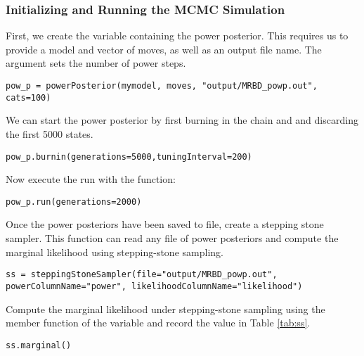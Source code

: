 \subsubsection{Initializing and Running the MCMC Simulation}



First, we create the variable containing the power posterior. 
This requires us to provide a model and vector of moves, as well as an output file name. 
The  argument sets the number of power steps.
{\tt \begin{snugshade*}
\begin{lstlisting}
pow_p = powerPosterior(mymodel, moves, "output/MRBD_powp.out", cats=100) 
\end{lstlisting}
\end{snugshade*}}

We can start the power posterior by first burning in the chain and and discarding the first 5000 states.  
{\tt \begin{snugshade*}
\begin{lstlisting}
pow_p.burnin(generations=5000,tuningInterval=200)
\end{lstlisting}
\end{snugshade*}}

Now execute the run with the  function:
{\tt \begin{snugshade*}
\begin{lstlisting}
pow_p.run(generations=2000)  
\end{lstlisting}
\end{snugshade*}}

Once the power posteriors have been saved to file, create a stepping stone sampler. 
This function can read any file of power posteriors and compute the marginal likelihood using stepping-stone sampling. 
{\tt \small \begin{snugshade*}
\begin{lstlisting}
ss = steppingStoneSampler(file="output/MRBD_powp.out", powerColumnName="power", likelihoodColumnName="likelihood")
\end{lstlisting}
\end{snugshade*}}

Compute the marginal likelihood under stepping-stone sampling using the member function  of the  variable and record the value in Table \ref{tab:ss}.
{\tt \begin{snugshade*}
\begin{lstlisting}
ss.marginal() 
\end{lstlisting}
\end{snugshade*}}


